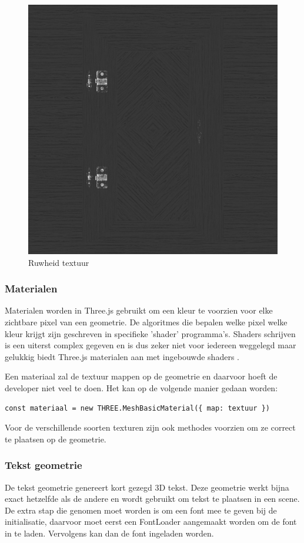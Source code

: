 \begin{figure}[]
	\centering
	\includegraphics[width=.5\linewidth]{graphics/roughnessTexture}
	\caption[Ruwheid textuur]{Ruwheid textuur}
	\label{fig:roughnessTexture}
\end{figure}

\newpage
\subsubsection{Materialen}

Materialen worden in Three.js gebruikt om een kleur te voorzien voor elke zichtbare pixel van een geometrie. De algoritmes die bepalen welke pixel welke kleur krijgt zijn geschreven in specifieke 'shader' programma's. Shaders schrijven is een uiterst complex gegeven en is dus zeker niet voor iedereen weggelegd maar gelukkig biedt Three.js materialen aan met ingebouwde shaders \autocite{Simon2023}.

Een materiaal zal de textuur mappen op de geometrie en daarvoor hoeft de developer niet veel te doen. Het kan op de volgende manier gedaan worden:

\begin{lstlisting}
const materiaal = new THREE.MeshBasicMaterial({ map: textuur })
\end{lstlisting}

Voor de verschillende soorten texturen zijn ook methodes voorzien om ze correct te plaatsen op de geometrie.

\subsubsection{Tekst geometrie}

De tekst geometrie genereert kort gezegd 3D tekst. Deze geometrie werkt bijna exact hetzelfde als de andere en wordt gebruikt om tekst te plaatsen in een scene. De extra stap die genomen moet worden is om een font mee te geven bij de initialisatie, daarvoor moet eerst een FontLoader aangemaakt worden om de font in te laden. Vervolgens kan dan de font ingeladen worden.

